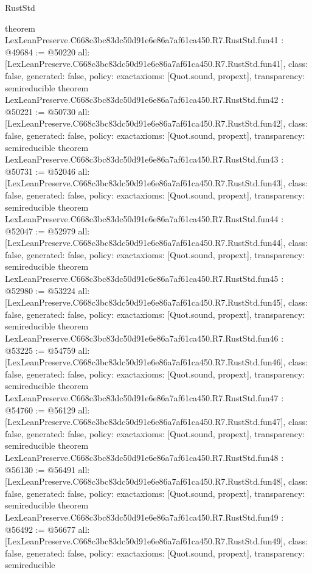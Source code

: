 \begin{lexlean}{RustStd}
\begin{coremodule}
{}
theorem LexLeanPreserve.C668c3bc83dc50d91e6e86a7af61ca450.R7.RustStd.fun41 : @49684 := @50220 {
  all: [LexLeanPreserve.C668c3bc83dc50d91e6e86a7af61ca450.R7.RustStd.fun41],
  class: false,
  generated: false,
  policy: exact{axioms: [Quot.sound, propext]},
  transparency: semireducible
}
theorem LexLeanPreserve.C668c3bc83dc50d91e6e86a7af61ca450.R7.RustStd.fun42 : @50221 := @50730 {
  all: [LexLeanPreserve.C668c3bc83dc50d91e6e86a7af61ca450.R7.RustStd.fun42],
  class: false,
  generated: false,
  policy: exact{axioms: [Quot.sound, propext]},
  transparency: semireducible
}
theorem LexLeanPreserve.C668c3bc83dc50d91e6e86a7af61ca450.R7.RustStd.fun43 : @50731 := @52046 {
  all: [LexLeanPreserve.C668c3bc83dc50d91e6e86a7af61ca450.R7.RustStd.fun43],
  class: false,
  generated: false,
  policy: exact{axioms: [Quot.sound, propext]},
  transparency: semireducible
}
theorem LexLeanPreserve.C668c3bc83dc50d91e6e86a7af61ca450.R7.RustStd.fun44 : @52047 := @52979 {
  all: [LexLeanPreserve.C668c3bc83dc50d91e6e86a7af61ca450.R7.RustStd.fun44],
  class: false,
  generated: false,
  policy: exact{axioms: [Quot.sound, propext]},
  transparency: semireducible
}
theorem LexLeanPreserve.C668c3bc83dc50d91e6e86a7af61ca450.R7.RustStd.fun45 : @52980 := @53224 {
  all: [LexLeanPreserve.C668c3bc83dc50d91e6e86a7af61ca450.R7.RustStd.fun45],
  class: false,
  generated: false,
  policy: exact{axioms: [Quot.sound, propext]},
  transparency: semireducible
}
theorem LexLeanPreserve.C668c3bc83dc50d91e6e86a7af61ca450.R7.RustStd.fun46 : @53225 := @54759 {
  all: [LexLeanPreserve.C668c3bc83dc50d91e6e86a7af61ca450.R7.RustStd.fun46],
  class: false,
  generated: false,
  policy: exact{axioms: [Quot.sound, propext]},
  transparency: semireducible
}
theorem LexLeanPreserve.C668c3bc83dc50d91e6e86a7af61ca450.R7.RustStd.fun47 : @54760 := @56129 {
  all: [LexLeanPreserve.C668c3bc83dc50d91e6e86a7af61ca450.R7.RustStd.fun47],
  class: false,
  generated: false,
  policy: exact{axioms: [Quot.sound, propext]},
  transparency: semireducible
}
theorem LexLeanPreserve.C668c3bc83dc50d91e6e86a7af61ca450.R7.RustStd.fun48 : @56130 := @56491 {
  all: [LexLeanPreserve.C668c3bc83dc50d91e6e86a7af61ca450.R7.RustStd.fun48],
  class: false,
  generated: false,
  policy: exact{axioms: [Quot.sound, propext]},
  transparency: semireducible
}
theorem LexLeanPreserve.C668c3bc83dc50d91e6e86a7af61ca450.R7.RustStd.fun49 : @56492 := @56677 {
  all: [LexLeanPreserve.C668c3bc83dc50d91e6e86a7af61ca450.R7.RustStd.fun49],
  class: false,
  generated: false,
  policy: exact{axioms: [Quot.sound, propext]},
  transparency: semireducible
}
\end{coremodule}
\end{lexlean}
